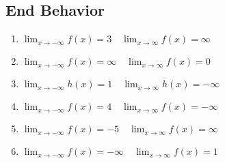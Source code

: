 \subsection*{End Behavior}
\begin{enumerate}
	\item $\displaystyle \lim_{x \to -\infty} f(x) = 3 \quad \lim_{x \to \infty} f(x) = \infty$
	\item $\displaystyle \lim_{x \to -\infty} f(x) = \infty \quad \lim_{x \to \infty} f(x) =0$ 
	\item $\displaystyle \lim_{x \to -\infty} h(x) = 1 \quad \lim_{x \to \infty} h(x) = - \infty$
	\item $\displaystyle \lim_{x \to -\infty} f(x) = 4 \quad \lim_{x \to \infty} f(x) = -\infty$
    \item $\displaystyle \lim_{x \to -\infty} f(x) = -5 \quad \lim_{x \to \infty} f(x) = \infty$
    \item $\displaystyle \lim_{x \to -\infty} f(x) = -\infty \quad \lim_{x \to \infty} f(x) = 1$
\end{enumerate}
